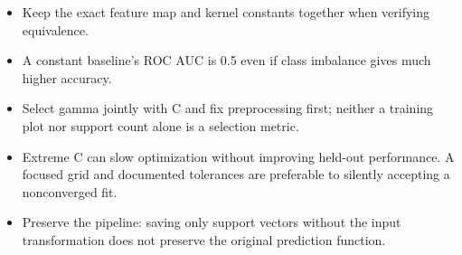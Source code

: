 \begin{itemize}
\item Keep the exact feature map and kernel constants together when verifying equivalence.
\item A constant baseline's ROC AUC is 0.5 even if class imbalance gives much higher accuracy.
\item Select gamma jointly with C and fix preprocessing first; neither a training plot nor support count alone is a selection metric.
\item Extreme C can slow optimization without improving held-out performance. A focused grid and documented tolerances are preferable to silently accepting a nonconverged fit.
\item Preserve the pipeline: saving only support vectors without the input transformation does not preserve the original prediction function.
\end{itemize}

